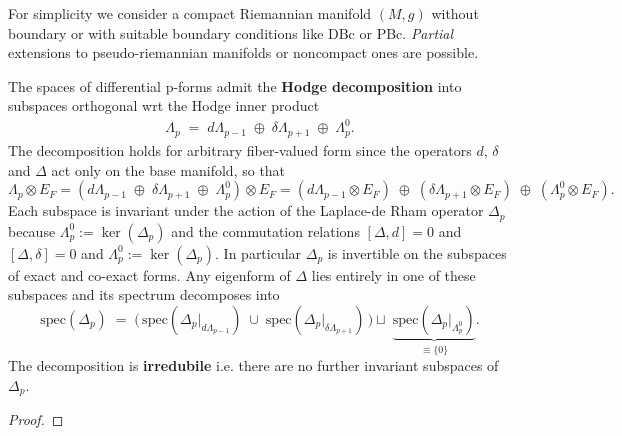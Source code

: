 \begin{mytheorem}
%
For simplicity we consider a compact Riemannian manifold $(M,g)$ without boundary or with suitable boundary conditions like DBc or PBc.
\emph{Partial} extensions to pseudo-riemannian manifolds or noncompact ones are possible.

The spaces of differential p-forms admit the \textbf{Hodge decomposition} into subspaces orthogonal wrt the Hodge inner product
\begin{align}
    \Lambda_p \;=\;d\Lambda_{p-1}\;\oplus\;\delta\Lambda_{p+1}\;\oplus\;\Lambda_p^0.
\end{align}
The decomposition holds for arbitrary fiber-valued form since the operators \(d\), \(\delta\) and \(\Delta\) act only on the base manifold, so that 
 \begin{equation}
    \Lambda_p \otimes E_F = \left(d\Lambda_{p-1}\;\oplus\;\delta\Lambda_{p+1}\;\oplus\;\Lambda_p^0\right)\otimes E_F = \left(d\Lambda_{p-1}\otimes E_F\right)\;\oplus\;\left(\delta\Lambda_{p+1}\otimes E_F\right)\;\oplus\;\left(\Lambda_p^0\otimes E_F\right).
\end{equation}
Each subspace is invariant under the action of the Laplace-de Rham operator \(\Delta_p\) because $\Lambda_p^0:=\ker(\Delta_p)$ and the commutation relations \([\Delta,d]=0\) and \([\Delta,\delta]=0\) and $\Lambda_p^0:=\ker(\Delta_p)$.
In particular $\Delta_p$ is invertible on the subspaces of exact and co-exact forms.
Any eigenform of $\Delta$ lies entirely in one of these subspaces and its spectrum decomposes into
\begin{equation}
    \mathrm{spec}(\Delta_p) \;=\; \Big(\,\mathrm{spec}(\Delta_p|_{d\Lambda_{p-1}}) \;\cup\; \mathrm{spec}(\Delta_p|_{\delta\Lambda_{p+1}})\,\Big) \sqcup\; \underbrace{\mathrm{spec}(\Delta_p|_{\Lambda_p^0})}_{\equiv\{0\}}.
\end{equation}
The decomposition is \textbf{irredubile} i.e. there are no further invariant subspaces of \(\Delta_p\).
\end{mytheorem}
\begin{proof}
\end{proof}

